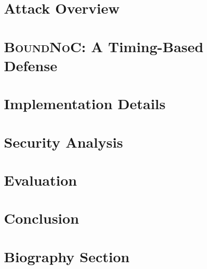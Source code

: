 \documentclass[journal]{IEEEtran}
\newcommand{\scheme}{\textsc{BoundNoC}}
\begin{document}
\section{Attack Overview}
\label{sec:attack-overview}


\section{\scheme{}: A Timing-Based Defense} %
\label{sec:desc}


\section{Implementation Details}
\label{sec:impl}


%
\section{Security Analysis}
\label{sec:security}



\section{Evaluation}
\label{sec:eval}



\section{Conclusion}
\label{sec:conclusion}








\section{Biography Section}


\newpage
\appendix

\end{document}
